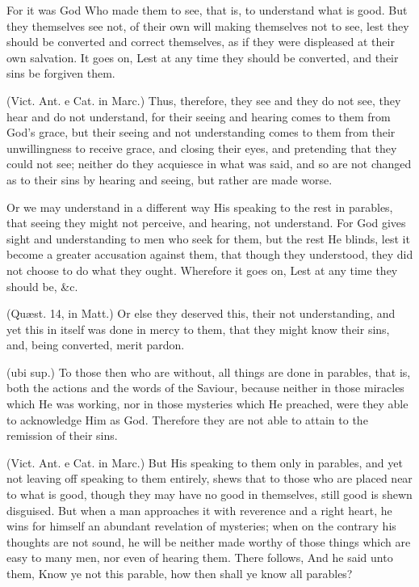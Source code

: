 For it was God Who made them to see, that is, to understand what is good. But they themselves see not, of their own will making themselves not to see, lest they should be converted and correct themselves, as if they were displeased at their own salvation. It goes on, Lest at any time they should be converted, and their sins be forgiven them.

 (Vict. Ant. e Cat. in Marc.) Thus, therefore, they see and they do not see, they hear and do not understand, for their seeing and hearing comes to them from God’s grace, but their seeing and not understanding comes to them from their unwillingness to receive grace, and closing their eyes, and pretending that they could not see; neither do they acquiesce in what was said, and so are not changed as to their sins by hearing and seeing, but rather are made worse.

 Or we may understand in a different way His speaking to the rest in parables, that seeing they might not perceive, and hearing, not understand. For God gives sight and understanding to men who seek for them, but the rest He blinds, lest it become a greater accusation against them, that though they understood, they did not choose to do what they ought. Wherefore it goes on, Lest at any time they should be, \&c.

 (Quæst. 14, in Matt.) Or else they deserved this, their not understanding, and yet this in itself was done in mercy to them, that they might know their sins, and, being converted, merit pardon.

 (ubi sup.) To those then who are without, all things are done in parables, that is, both the actions and the words of the Saviour, because neither in those miracles which He was working, nor in those mysteries which He preached, were they able to acknowledge Him as God. Therefore they are not able to attain to the remission of their sins.

 (Vict. Ant. e Cat. in Marc.) But His speaking to them only in parables, and yet not leaving off speaking to them entirely, shews that to those who are placed near to what is good, though they may have no good in themselves, still good is shewn disguised. But when a man approaches it with reverence and a right heart, he wins for himself an abundant revelation of mysteries; when on the contrary his thoughts are not sound, he will be neither made worthy of those things which are easy to many men, nor even of hearing them. There follows, And he said unto them, Know ye not this parable, how then shall ye know all parables?

